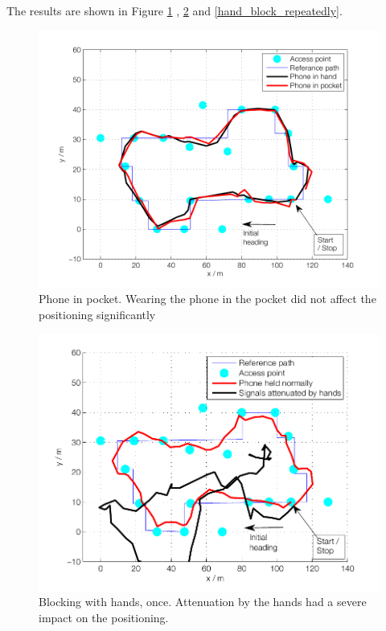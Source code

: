 \documentclass{LTHthesis}
\begin{document}
The results are shown in Figure \ref{positioning_pocket} , \ref{hand_block} and \ref{hand_block_repeatedly}.



\begin{figure}[!hbt]

\includegraphics[width=1\textwidth ]{images/adapt_parameters/positioning_pocket}
\caption{Phone in pocket. Wearing the phone in the pocket did not affect the positioning significantly}\label{positioning_pocket}
\end{figure}

\begin{figure}[!hbt]

\includegraphics[width=1\textwidth ]{images/adapt_parameters/hand_block}
\caption{Blocking with hands, once. Attenuation by the hands had a severe impact on the positioning.}\label{hand_block}
\end{figure}
\end{document}
